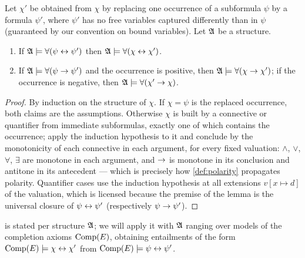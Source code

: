 \begin{lemma}[Replacement]
  \label{lem:replacement}
  Let $\chi'$ be obtained from $\chi$ by replacing one occurrence of a
  subformula $\psi$ by a formula $\psi'$, where $\psi'$ has no free
  variables captured differently than in $\psi$ (guaranteed by our
  convention on bound variables).  Let $\AA$ be a structure.
  \begin{enumerate}[label=(\roman*)]
  \item If $\AA \models \forall(\psi \biimp \psi')$ then
    $\AA \models \forall(\chi \biimp \chi')$.
  \item If $\AA \models \forall(\psi \imp \psi')$ and the occurrence is
    positive, then $\AA \models \forall(\chi \imp \chi')$; if the occurrence
    is negative, then $\AA \models \forall(\chi' \imp \chi)$.
  \end{enumerate}
\end{lemma}

\begin{proof}
  By induction on the structure of $\chi$.  If $\chi = \psi$ is the replaced
  occurrence, both claims are the assumptions.  Otherwise $\chi$ is built by
  a connective or quantifier from immediate subformulas, exactly one of
  which contains the occurrence; apply the induction hypothesis to it and
  conclude by the monotonicity of each connective in each argument, for
  every fixed valuation: $\wedge$, $\vee$, $\forall$, $\exists$ are monotone
  in each argument, and $\imp$ is monotone in its conclusion and antitone in
  its antecedent --- which is precisely how \cref{def:polarity} propagates
  polarity.  Quantifier cases use the induction hypothesis at all extensions
  $v[x \mapsto d]$ of the valuation, which is licensed because the premise
  of the lemma is the universal closure of $\psi \biimp \psi'$
  (respectively $\psi \imp \psi'$).
\end{proof}

\begin{remark}
   is stated per structure $\AA$; we will apply it
  with $\AA$ ranging over models of the completion axioms $\Comp$, obtaining
  entailments of the form $\Comp \models \chi \biimp \chi'$ from
  $\Comp \models \psi \biimp \psi'$.
\end{remark}
